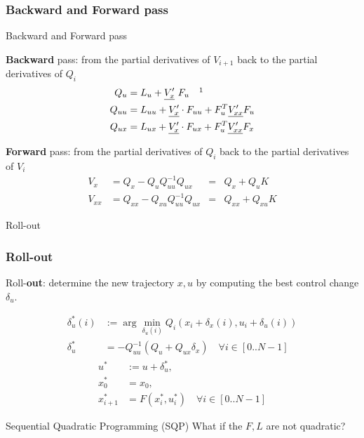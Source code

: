\documentclass{beamer}
\begin{document}
\subsubsection{Backward and Forward pass}

\begin{frame}{Backward and Forward pass}

\textbf{Backward} pass: from the partial derivatives of $V_{i+1}$ back to the partial derivatives of $Q_i$
\begin{equation}
\label{QfromV}
\begin{split}
Q_u & = L_u + \underline{V'_x}   \ F_u \quad \footnotemark \\
Q_{uu} &= L_{uu} + \underline{V'_x} \cdot F_{uu} + F_u^T \underline{V'_{xx}} F_u \\
Q_{ux} &= L_{ux} + \underline{V'_x} \cdot F_{ux} + F_u^T \underline{V'_{xx}} F_x
\end{split}
\end{equation}


\textbf{Forward} pass: from the partial derivatives of $Q_i$ back to the partial derivatives of $V_i$
\begin{equation}
\label{VfromQ}
\begin{aligned}
V_x &= Q_x - Q_u Q_{uu}^{-1} Q_{ux} &=& Q_x + Q_u K \\
V_{xx} &= Q_{xx} - Q_{xu} Q_{uu}^{-1} Q_{ux} &=& Q_{xx} + Q_{xu} K
\end{aligned}
\end{equation}

\end{frame}


\begin{frame}{Roll-out}
\subsubsection{Roll-out}
Roll-\textbf{out}: determine the new trajectory $x, u$ by computing the best control change $\delta_u$.

\begin{equation}
\begin{split}
\delta_u^* (i) &:= \arg\min_{\delta_u(i)}Q_i(x_i + \delta_x(i), u_i + \delta_u(i) ) \\
\delta_u^* &=  - Q_{uu}^{-1} (Q_u + Q_{ux} \delta_x) \quad \forall i \in [0 .. N-1]
\end{split}
\end{equation} 
\begin{equation}
\begin{split}
u^* &:= u + \delta_u^*, \\
x^*_0      &= x_0,  \\ %
x_{i+1}^*     &= F(x_i^*, u_i^*) \quad \forall i \in [0 .. N-1]
\end{split}
\end{equation}

\end{frame}

\begin{frame}	{Sequential Quadratic Programming (SQP)}
What if the $F, L$ are not quadratic?
\end{frame}
\end{document}
